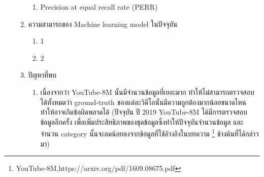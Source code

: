 \begin{enumerate}
\begin{enumerate}
\begin{enumerate}
			\item Precision at equal recall rate (PERR)
		\end{enumerate}
		\item ความสามารถของ Machine learning model ในปัจจุบัน
		\begin{enumerate}
			\setlength\itemsep{-0.25em}
			\item 1 %
			\item 2 %
		\end{enumerate}
		\item ปัญหาที่พบ
		\begin{enumerate}
		\item เนื่องจากว่า YouTube-8M นั้นมีจำนวนข้อมูลที่เยอะมาก ทำให้ไม่สามารถตรวจสอบได้ทั้งหมดว่า ground-truth ของแต่ละวิดีโอนั้นมีความถูกต้องมากน้อยขนาดไหน ทำให้อาจเกิดข้อผิดพลาดได้ (ปัจจุบัน ปี 2019 YouTube-8M ได้มีการตรวจสอบข้อมูลอีกครั้ง เพื่อเพิ่มประสิทธิภาพของชุดข้อมูลซึ่งทำให้ปัจจุบันจำนวนข้อมูล และจำนวน category นั้นจะลดน้อยลงจากข้อมูลที่ใช้อ้างอิงในบทความ \footnote{YouTube-8M,https://arxiv.org/pdf/1609.08675.pdf} ข้างต้นที่ได้กล่าวมา)
	\end{enumerate}	

	\end{enumerate}	
	\end{enumerate}	

\clearpage
